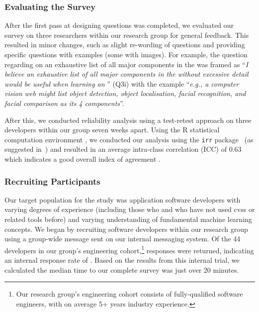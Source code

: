 \subsubsection{Evaluating the Survey}
\label{tse2020:sec:validation:survey:eval}

After the first pass at designing questions was completed, we evaluated our survey on three researchers within our research group for general feedback. This resulted in minor changes, such as slight re-wording of questions and providing specific questions with examples (some with images). For example, the question regarding  on an exhaustive list of all major components in the  was framed as ``\textit{I believe an exhaustive list of all major components in the  without excessive detail would be useful when learning an }'' (Q3i) with the example ``\textit{e.g., a computer vision web  might list object detection, object localisation, facial recognition, and facial comparison as its 4 components}''.

After this, we conducted reliability analysis using a test-retest approach on three developers within our group seven weeks apart. Using the R statistical computation environment \citep{RCoreTeam}, we conducted our analysis using the \texttt{irr} package~\citep{Gamer:tj} (as suggested in~\citep{Hallgren:2012kt}) and  resulted in an average intra-class correlation (ICC) of 0.63 which indicates a good overall index of agreement \citep{cicchetti1994guidelines}.

\subsubsection{Recruiting Participants}

Our target population for the study was application software developers with varying degrees of experience (including those who and who have not used \glspl{cvs} or related tools before) and varying understanding of fundamental machine learning concepts. We began by recruiting software developers within our research group using a group-wide message sent on our internal messaging system. Of the 44 developers in our group's engineering cohort,\footnote{Our research group's engineering cohort consists of fully-qualified software engineers, with on average 5+ years industry experience.} \SurveyParticipantsInternal{} responses were returned, indicating an internal response rate of \SurveyParticipantsInternalResponseRate{}. Based on the \SurveyParticipantsInternal{} results from this internal trial, we calculated the median time to our complete survey was just over 20 minutes.

